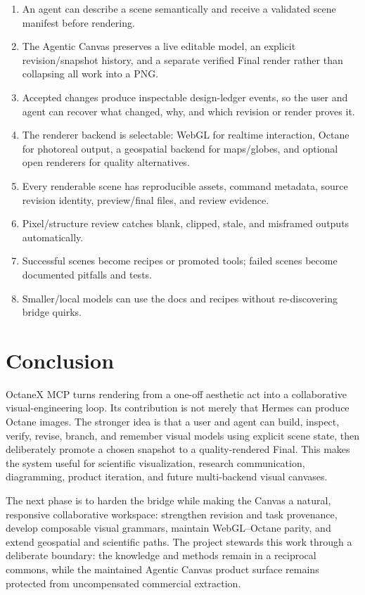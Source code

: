 \documentclass[11pt,a4paper]{article}
\newcommand{\project}{OctaneX MCP}
\begin{document}
\begin{enumerate}[leftmargin=*]
  \item An agent can describe a scene semantically and receive a validated scene manifest before rendering.
  \item The Agentic Canvas preserves a live editable model, an explicit revision/snapshot history, and a separate verified Final render rather than collapsing all work into a PNG.
  \item Accepted changes produce inspectable design-ledger events, so the user and agent can recover what changed, why, and which revision or render proves it.
  \item The renderer backend is selectable: WebGL for realtime interaction, Octane for photoreal output, a geospatial backend for maps/globes, and optional open renderers for quality alternatives.
  \item Every renderable scene has reproducible assets, command metadata, source revision identity, preview/final files, and review evidence.
  \item Pixel/structure review catches blank, clipped, stale, and misframed outputs automatically.
  \item Successful scenes become recipes or promoted tools; failed scenes become documented pitfalls and tests.
  \item Smaller/local models can use the docs and recipes without re-discovering bridge quirks.
\end{enumerate}

\section{Conclusion}

\project{} turns rendering from a one-off aesthetic act into a collaborative visual-engineering loop. Its contribution is not merely that Hermes can produce Octane images. The stronger idea is that a user and agent can build, inspect, verify, revise, branch, and remember visual models using explicit scene state, then deliberately promote a chosen snapshot to a quality-rendered Final. This makes the system useful for scientific visualization, research communication, diagramming, product iteration, and future multi-backend visual canvases.

The next phase is to harden the bridge while making the Canvas a natural, responsive collaborative workspace: strengthen revision and task provenance, develop composable visual grammars, maintain WebGL--Octane parity, and extend geospatial and scientific paths. The project stewards this work through a deliberate boundary: the knowledge and methods remain in a reciprocal commons, while the maintained Agentic Canvas product surface remains protected from uncompensated commercial extraction.
\end{document}
